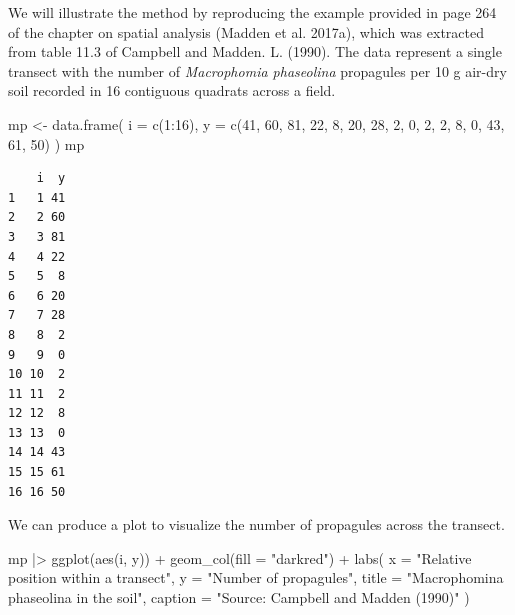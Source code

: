 \documentclass[
  letterpaper,
  DIV=11,
  numbers=noendperiod]{scrreprt}
\newenvironment{Shaded}{\begin{snugshade}}{\end{snugshade}}
\newcommand{\AttributeTok}[1]{\textcolor[rgb]{0.40,0.45,0.13}{#1}}
\newcommand{\DecValTok}[1]{\textcolor[rgb]{0.68,0.00,0.00}{#1}}
\newcommand{\FunctionTok}[1]{\textcolor[rgb]{0.28,0.35,0.67}{#1}}
\newcommand{\NormalTok}[1]{\textcolor[rgb]{0.00,0.23,0.31}{#1}}
\newcommand{\OtherTok}[1]{\textcolor[rgb]{0.00,0.23,0.31}{#1}}
\newcommand{\SpecialCharTok}[1]{\textcolor[rgb]{0.37,0.37,0.37}{#1}}
\newcommand{\StringTok}[1]{\textcolor[rgb]{0.13,0.47,0.30}{#1}}
\begin{document}
We will illustrate the method by reproducing the example provided in
page 264 of the chapter on spatial analysis (Madden et al. 2017a), which
was extracted from table 11.3 of Campbell and Madden. L. (1990). The
data represent a single transect with the number of \emph{Macrophomia
phaseolina} propagules per 10 g air-dry soil recorded in 16 contiguous
quadrats across a field.

\begin{Shaded}
\begin{Highlighting}[]
\NormalTok{mp }\OtherTok{\textless{}{-}} \FunctionTok{data.frame}\NormalTok{(}
  \AttributeTok{i =} \FunctionTok{c}\NormalTok{(}\DecValTok{1}\SpecialCharTok{:}\DecValTok{16}\NormalTok{),}
  \AttributeTok{y =} \FunctionTok{c}\NormalTok{(}\DecValTok{41}\NormalTok{, }\DecValTok{60}\NormalTok{, }\DecValTok{81}\NormalTok{, }\DecValTok{22}\NormalTok{, }\DecValTok{8}\NormalTok{, }\DecValTok{20}\NormalTok{, }\DecValTok{28}\NormalTok{, }\DecValTok{2}\NormalTok{, }\DecValTok{0}\NormalTok{, }\DecValTok{2}\NormalTok{, }\DecValTok{2}\NormalTok{, }\DecValTok{8}\NormalTok{, }\DecValTok{0}\NormalTok{, }\DecValTok{43}\NormalTok{, }\DecValTok{61}\NormalTok{, }\DecValTok{50}\NormalTok{)}
\NormalTok{)}
\NormalTok{mp}
\end{Highlighting}
\end{Shaded}

\begin{verbatim}
    i  y
1   1 41
2   2 60
3   3 81
4   4 22
5   5  8
6   6 20
7   7 28
8   8  2
9   9  0
10 10  2
11 11  2
12 12  8
13 13  0
14 14 43
15 15 61
16 16 50
\end{verbatim}

We can produce a plot to visualize the number of propagules across the
transect.

\begin{Shaded}
\begin{Highlighting}[]
\NormalTok{mp }\SpecialCharTok{|\textgreater{}}
  \FunctionTok{ggplot}\NormalTok{(}\FunctionTok{aes}\NormalTok{(i, y)) }\SpecialCharTok{+}
  \FunctionTok{geom\_col}\NormalTok{(}\AttributeTok{fill =} \StringTok{"darkred"}\NormalTok{) }\SpecialCharTok{+}
  \FunctionTok{labs}\NormalTok{(}
    \AttributeTok{x =} \StringTok{"Relative position within a transect"}\NormalTok{,}
    \AttributeTok{y =} \StringTok{"Number of propagules"}\NormalTok{,}
    \AttributeTok{title =} \StringTok{"Macrophomina phaseolina in the soil"}\NormalTok{,}
    \AttributeTok{caption =} \StringTok{"Source: Campbell and Madden (1990)"}
\NormalTok{  )}
\end{Highlighting}
\end{Shaded}
\end{document}
